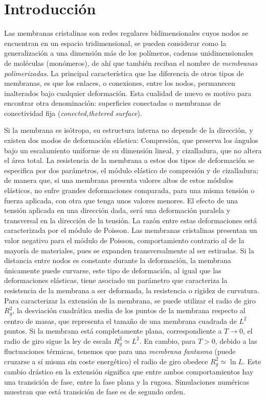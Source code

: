 \chapter{Introducción}

Las membranas cristalinas son redes regulares bidimensionales cuyos nodos se
encuentran en un espacio tridimensional, se pueden considerar como la
generalización a una dimensión más de los polímeros, cadenas unidimensionales
de moléculas (monómeros), de ahí que también reciban el nombre de
\textit{membranas polimerizadas}. La principal característica que las
diferencia de otros tipos de membranas, es que los enlaces, o conexiones,
entre los nodos, permanecen inalterados bajo cualquier deformación. Esta
cualidad de nuevo es motivo para encontrar otra denominación: superficies
conectadas o membranas de conectividad fija (\textit{conected,thetered surface}).  

Si la membrana es isótropa, su estructura interna no depende de la dirección,
y existen dos modos de deformación elástica: Compresión, que preserva
los ángulos bajo un escalamiento uniforme de su dimensión lineal, y
cizalladura, que no altera el área total. La resistencia de la membrana a
estos dos tipos de deformación se especifica por dos parámetros, el módulo
elástico de compresión y de cizalladura; de manera que, si una membrana
presenta valores altos de estos módulos elásticos, no sufre grandes
deformaciones comparada, para una misma tensión o fuerza aplicada, con otra que tenga
unos valores menores. El efecto de una tensión aplicada en una
dirección dada, será una deformación paralela y transversal en la dirección de
la tensión. La razón entre estas deformaciones está caracterizada por el
módulo de Poisson. Las membranas cristalinas presentan un valor
negativo para el módulo de Poisson, comportamiento contrario al de la mayoría
de materiales, pues se expanden transversalmente al ser estiradas. 
Si la distancia entre nodos es constante durante la deformación, la membrana
únicamente puede curvarse, este tipo de deformación, al igual que las
deformaciones elásticas, tiene asociado un parámetro que caracteriza la
resistencia de la membrana a ser deformada, la resistencia o rigidez de
curvatura. Para caracterizar la extensión de la membrana, se puede utilizar el
radio de giro $R^2_g$, la desviación cuadrática media de los puntos de la
membrana respecto al centro de masas, que representa el tamaño de una membrana cuadrada
de $L^2$ puntos. Si la membrana está completamente plana, correspondiente a
$T\rightarrow 0$, el radio de giro sigue la ley de escala $R^2_g\simeq L^2$. En cambio,
para $T>0$, debido a las fluctuaciones térmicas, tenemos que para una \textit{membrana
fantasma} (puede cruzarse a sí misma sin coste energético) el radio de giro
obedece $R^2_g\simeq \ln L$. Este cambio drástico en la extensión significa
que entre ambos comportamientos hay una transición de fase, entre la fase
plana y la rugosa. Simulaciones numéricas muestran que está transición de fase
es de segundo orden.

